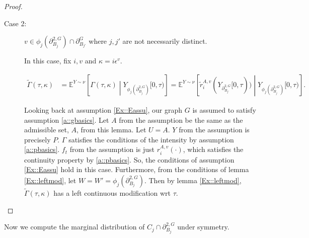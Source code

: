 \documentclass[12pt]{article}
\newcommand{\skipLine}{\vspace{12pt}}
\newcommand{\mb}{\mathbb}
\newcommand{\ep}{\epsilon}
\newcommand{\ind}{\hspace{24pt}}
\newcommand{\exmu}[2]{\mb{E}^{#1}\left[#2\right]}	%
\newcommand{\gneigh}[2]{\partial^{#1}_{#2}}			%
\newcommand{\dgneigh}[2]{\partial^{2,#1}_{#2}}		%
\newcommand{\indx}[1]{^{#1}}						%
\newcommand{\rate}{r}								%
\newcommand{\vind}[1]{_{#1}}						%
\newcommand{\tmi}[1]{#1}							%
\newcommand{\stpara}[1]{_{#1}}						%
\newcommand{\gvpara}[2]{^{#1,#2}}					%
\newcommand{\psize}{\ell}							%
\newcommand{\Xg}{Y}									%
\newcommand{\brate}{\alt{\rate}}					%
\newcommand{\inte}[1]{{#1}^\mathrm{o}}				%
\newcommand{\alt}[1]{\tilde{#1}}					%
\newcommand{\rt}{\tau}								%
\renewcommand{\mark}{\kappa}						%
\newcommand{\ratee}{\Gamma}							%
\newcommand{\cratee}{\alt{\ratee}}					%
\newcommand{\rp}{P}									%
\newcommand{\mm}{\nu}								%
\newcommand{\ev}[1]{\ep^{#1}}						%
\newtheorem{lem}[thms]{Lemma}
\begin{document}
\begin{proof}
\begin{description}
\skipLine

\item[Case 2: ] \(v \in \phi_j(\dgneigh{G}{B_j})\cap\gneigh{G}{B_{j'}}\) where \(j,j'\) are not necessarily distinct.

In this case, fix \(i,v\) and \(\mark = i\ev{v}\).

\begin{align*}
\cratee(\rt,\mark) &= \exmu{\Xg\sim\mm}{\ratee(\rt,\mark)\middle|\Xg\vind{\phi_j(\dgneigh{G}{B_j})}\tmi{[0,\rt)}} = \exmu{\Xg\sim\mm}{\brate\gvpara{A}{v}\stpara{i}(\Xg\vind{\dgneigh{G}{B_{j'}}}\tmi{[0,\rt)})\middle|\Xg\vind{\phi_j(\dgneigh{G}{B_j})}\tmi{[0,\rt)}}.
\end{align*}

Looking back at assumption \ref{Ex::Eassu}, our graph \(G\) is assumed to satisfy assumption \ref{a::gbasics}. Let \(A\) from the assumption be the same as the admissible set, \(A\), from this lemma. Let \(U = A\). \(\Xg\) from the assumption is precisely \(\rp\). \(\ratee\) satisfies the conditions of the intensity by assumption \ref{a::pbasics}. \(f_t\) from the assumption is just \(\rate\gvpara{A}{v}\stpara{i}(\cdot)\), which satisfies the continuity property by \ref{a::pbasics}. So, the conditions of assumption \ref{Ex::Eassu} hold in this case. Furthermore, from the conditions of lemma \ref{Ex::leftmod}, let \(W = W' = \phi_j(\dgneigh{G}{B_j})\). Then by lemma \ref{Ex::leftmod}, \(\cratee(\rt,\mark)\) has a left continuous modification wrt \(\rt\).
\end{description}
\end{proof}

Now we compute the marginal distribution of \(C_j\cap\dgneigh{G}{B_j}\) under symmetry. 
%
%
\end{document}
